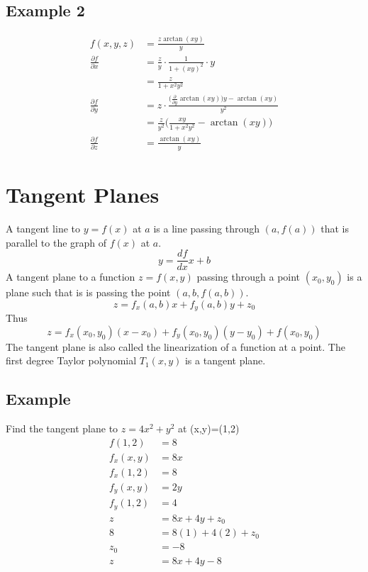 \documentclass{article}
\theoremstyle{mytheoremstyle}
\theoremstyle{mytheoremstyle}
\theoremstyle{myproblemstyle}
\begin{document}
    \subsection*{Example 2}
    \begin{align*}
        f(x,y,z) &= \frac{z\arctan(xy)}{y} \\
        \frac{\partial f}{\partial x}
        &= \frac{z}{y} \cdot \frac{1}{1+(xy)^2} \cdot y \\
        &= \frac{z}{1+x^2y^2} \\
        \frac{\partial f}{\partial y}
        &= z \cdot \frac{\Big(\frac{\partial }{\partial y} \arctan(xy)\Big)y-\arctan(xy)}{y^2} \\
        &= \frac{z}{y^2} \Big(\frac{xy}{1+x^2y^2} - \arctan(xy)\Big) \\
        \frac{\partial f}{\partial z}
        &= \frac{\arctan(xy)}{y} 
    \end{align*}

    \section*{Tangent Planes}
    A tangent line to $y=f(x)$ at $a$ is a line passing through $(a,f(a))$ that is
    parallel to the graph of $f(x)$ at $a$.
    \[
        y = \frac{df}{dx}x+b
    \]
    A tangent plane to a function $z=f(x,y)$ passing through a point $(x_0,y_0)$
    is a plane such that is is passing the point $(a,b,f(a,b))$.
    \[
        z = f_x(a,b)x + f_y(a,b)y + z_0
    \]
    Thus
    \[
        z = f_x(x_0,y_0)(x-x_0) + f_y(x_0,y_0)(y-y_0) + f(x_0,y_0)
    \]
    The tangent plane is also called the linearization of a function at a point.
    The first degree Taylor polynomial $T_1(x,y)$ is a tangent plane.

    \subsection*{Example}
    Find the tangent plane to $z=4x^2+y^2$ at (x,y)=(1,2)
    \begin{align*}
        f(1,2)   &= 8 \\
        f_x(x,y) &= 8x \\
        f_x(1,2) &= 8 \\
        f_y(x,y) &= 2y \\
        f_y(1,2) &= 4 \\
        z        &= 8x + 4y + z_0 \\
        8        &= 8(1) + 4(2) + z_0 \\
        z_0      &= -8 \\
        z        &= 8x + 4y - 8
    \end{align*}
\end{document}
